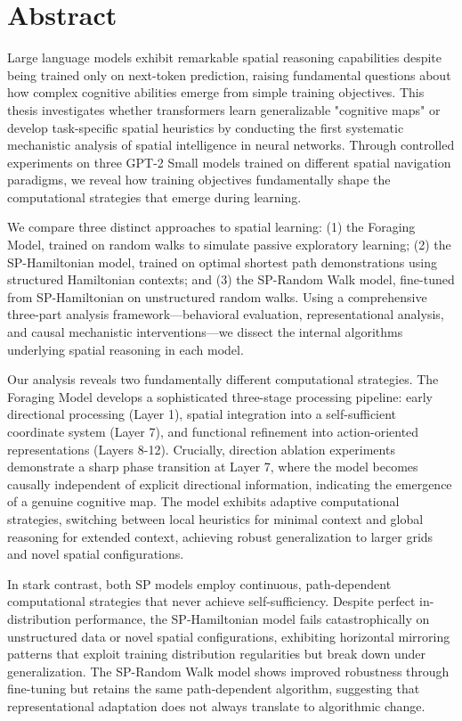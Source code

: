 \documentclass[11pt,a4paper,oneside]{book}
\begin{document}
\section*{Abstract}
Large language models exhibit remarkable spatial reasoning capabilities despite being trained only on next-token prediction, raising fundamental questions about how complex cognitive abilities emerge from simple training objectives. This thesis investigates whether transformers learn generalizable "cognitive maps" or develop task-specific spatial heuristics by conducting the first systematic mechanistic analysis of spatial intelligence in neural networks. Through controlled experiments on three GPT-2 Small models trained on different spatial navigation paradigms, we reveal how training objectives fundamentally shape the computational strategies that emerge during learning.

We compare three distinct approaches to spatial learning: (1) the Foraging Model, trained on random walks to simulate passive exploratory learning; (2) the SP-Hamiltonian model, trained on optimal shortest path demonstrations using structured Hamiltonian contexts; and (3) the SP-Random Walk model, fine-tuned from SP-Hamiltonian on unstructured random walks. Using a comprehensive three-part analysis framework—behavioral evaluation, representational analysis, and causal mechanistic interventions—we dissect the internal algorithms underlying spatial reasoning in each model.

Our analysis reveals two fundamentally different computational strategies. The Foraging Model develops a sophisticated three-stage processing pipeline: early directional processing (Layer 1), spatial integration into a self-sufficient coordinate system (Layer 7), and functional refinement into action-oriented representations (Layers 8-12). Crucially, direction ablation experiments demonstrate a sharp phase transition at Layer 7, where the model becomes causally independent of explicit directional information, indicating the emergence of a genuine cognitive map. The model exhibits adaptive computational strategies, switching between local heuristics for minimal context and global reasoning for extended context, achieving robust generalization to larger grids and novel spatial configurations.

In stark contrast, both SP models employ continuous, path-dependent computational strategies that never achieve self-sufficiency. Despite perfect in-distribution performance, the SP-Hamiltonian model fails catastrophically on unstructured data or novel spatial configurations, exhibiting horizontal mirroring patterns that exploit training distribution regularities but break down under generalization. The SP-Random Walk model shows improved robustness through fine-tuning but retains the same path-dependent algorithm, suggesting that representational adaptation does not always translate to algorithmic change.
\end{document}
